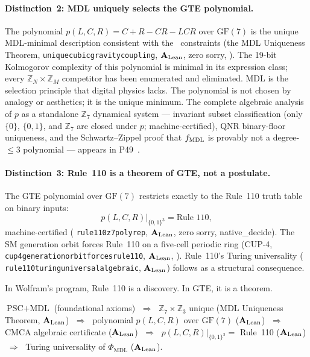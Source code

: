 \documentclass[11pt,openany]{book}
\theoremstyle{remark}
\newcommand{\MDL}{\text{MDL}}
\newcommand{\PSC}{\text{PSC}}
\newcommand{\PHIMDL}{\Phi_{\mathrm{MDL}}}
\newcommand{\ZS}{\mathbb{Z}_7}
\newcommand{\lean}[1]{%
  \penalty-100
  \begingroup\def\_{\textunderscore\allowbreak}\texttt{#1}\endgroup}
\newcommand{\poly}{p(L,C,R)}
\newcommand{\CatAL}{\ensuremath{\textbf{A}_{\rm Lean}}}
\begin{document}
\paragraph{Distinction~2: MDL uniquely selects the GTE polynomial.}

The polynomial $\poly = C+R-CR-LCR$ over $\mathrm{GF}(7)$ is the unique MDL-minimal
description consistent with the \PSC\ constraints (the MDL Uniqueness Theorem,
\lean{unique\_cubic\_gravity\_coupling}, \CatAL, zero sorry, \cite{SpivackGTEPolynomialUFT}).
The 19-bit Kolmogorov complexity of this polynomial is minimal in its expression class;
every $\mathbb{Z}_N\times\mathbb{Z}_M$ competitor has been enumerated and eliminated.
MDL is the selection principle that digital physics lacks.  The polynomial is not chosen
by analogy or aesthetics; it is the unique minimum.
The complete algebraic analysis of $p$ as a standalone $\mathbb{Z}_7$ dynamical system ---
invariant subset classification (only $\{0\}$, $\{0,1\}$, and $\mathbb{Z}_7$ are closed
under $p$; machine-certified), QNR binary-floor uniqueness, and the Schwartz--Zippel proof
that $f_{\rm MDL}$ is provably not a degree-$\leq 3$ polynomial --- appears in
P49~\cite{SpivackGTEPolynomialWolfram}.

\paragraph{Distinction~3: Rule~110 is a theorem of GTE, not a postulate.}

The GTE polynomial over $\mathrm{GF}(7)$ restricts exactly to the Rule~110 truth table
on binary inputs:
\begin{equation*}
  \poly\big|_{\{0,1\}^3} = \text{Rule~110},
\end{equation*}
machine-certified (\lean{rule110\_z7\_poly\_rep}, \CatAL, zero sorry, native\_decide).
The SM generation orbit forces Rule~110 on a five-cell periodic ring
(CUP-4, \lean{cup4\_generation\_orbit\_forces\_rule110}, \CatAL, \cite{SpivackSM}).
Rule~110's Turing universality (\lean{rule110\_turing\_universal\_algebraic}, \CatAL)
follows as a structural consequence.

In Wolfram's program, Rule~110 is a discovery.  In GTE, it is a theorem.

\begin{tcolorbox}[colback=green!5,colframe=green!50!black,
  title={The Digital Physics Chain in GTE}]
$\PSC + \MDL$ (foundational axioms)
$\;\Rightarrow\;$ $\ZS\times\mathbb{Z}_3$ unique (MDL Uniqueness Theorem, \CatAL)
$\;\Rightarrow\;$ polynomial $\poly$ over $\mathrm{GF}(7)$ (\CatAL)
$\;\Rightarrow\;$ CMCA algebraic certificate (\CatAL)
$\;\Rightarrow\;$ $\poly|_{\{0,1\}^3} = $ Rule~110 (\CatAL)
$\;\Rightarrow\;$ Turing universality of $\PHIMDL$ (\CatAL).
\end{tcolorbox}
\end{document}
